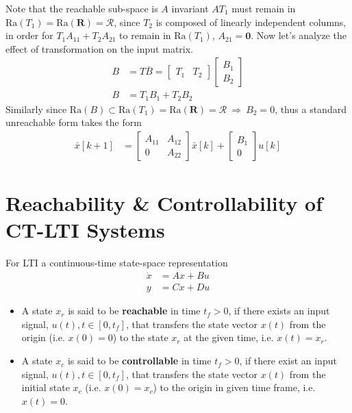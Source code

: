 \documentclass[twoside]{article}
\begin{document}
%
Note that the reachable sub-space is $A$ invariant $A T_1$ must remain in $\mathrm{Ra}(T_1) = \mathrm{Ra}(\mathbf{R}) = \mathcal{R}$,
since $T_2$ is composed of linearly independent columns, in order for $T_1 A_{11} + T_2 A_{21}$ to remain in $\mathrm{Ra}(T_1)$, $A_{21} = \mathbf{0}$.
Now let's analyze the effect of transformation on the input matrix.
%
\begin{align*}
    B &= T \bar{B} = \left[ \begin{array}{c|c} T_1 & T_2  \end{array} \right] \left[ \begin{array}{c} B_1 \\ B_2  \end{array} \right]
    \\
    B &= T_1 B_1 + T_2 B_2
\end{align*}
%
Similarly since $\mathrm{Ra}(B) \subset \mathrm{Ra}(T_1) = \mathrm{Ra}(\mathbf{R}) = \mathcal{R} \ \Rightarrow \ B_2 = 0$, thus a standard unreachable form takes the form
%
\begin{align*}
\bar{x}[k+1] &= \left[ \begin{array}{c|c} A_{11} & A_{12} \\ \hline 0 & A_{22}  \end{array} \right] \bar{x}[k]
+ \left[ \begin{array}{c} B_1 \\ 0 \end{array} \right] u[k]
\end{align*}

\newpage

\section{Reachability \& Controllability of CT-LTI Systems}

For LTI a continuous-time state-space representation
%
\begin{align*}
  \dot{x} &= A x + B u
\\
  y &= C x + D u
\end{align*}
%
\begin{itemize}
  \item A state $x_r$ is said to be \textbf{reachable} in time $t_f > 0$, if there exists
  an input signal, $u(t) , t \in [ 0 , t_f ]$, that transfers the state vector 
  $x(t)$ from the origin (i.e. $x(0) = 0$) to the state $x_r$ at the given time, 
   i.e. $x(t) = x_r$.
 
  \item A state $x_c$ is said to be \textbf{controllable} in time $t_f > 0$,
  if there exist an input signal, $u(t) , t \in [0 , t_f] $, that transfers the state vector 
  $x(t)$ from the initial state $x_c$ (i.e. $x(0) = x_c$) to the origin
  in given time frame, i.e. $x(t) = 0$.
\end{itemize}
\end{document}
